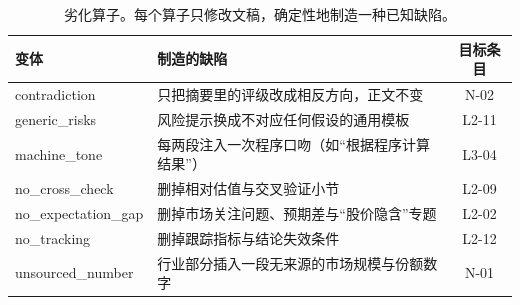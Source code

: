 \begin{table}[t]
\centering
\caption{劣化算子。每个算子只修改文稿，确定性地制造一种已知缺陷。}
\label{tab:degrade}
\small
\begin{tabularx}{\linewidth}{@{}p{2.6cm}Xc@{}}
\toprule
变体 & 制造的缺陷 & 目标条目 \\
\midrule
contradiction & 只把摘要里的评级改成相反方向，正文不变 & N-02 \\
generic\_risks & 风险提示换成不对应任何假设的通用模板 & L2-11 \\
machine\_tone & 每两段注入一次程序口吻（如“根据程序计算结果”） & L3-04 \\
no\_cross\_check & 删掉相对估值与交叉验证小节 & L2-09 \\
no\_expectation\_gap & 删掉市场关注问题、预期差与“股价隐含”专题 & L2-02 \\
no\_tracking & 删掉跟踪指标与结论失效条件 & L2-12 \\
unsourced\_number & 行业部分插入一段无来源的市场规模与份额数字 & N-01 \\
\bottomrule
\end{tabularx}
\end{table}
